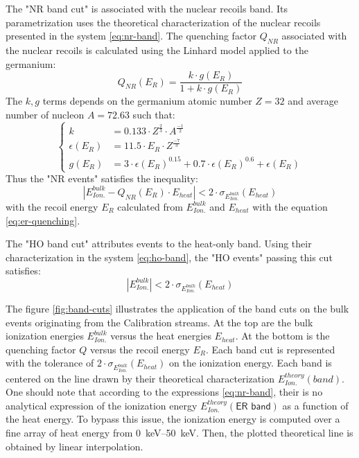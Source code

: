 The "NR band cut" is associated with the nuclear recoils band. Its parametrization uses the theoretical characterization of the nuclear recoils presented in the system \ref{eq:nr-band}. The quenching factor $Q_{NR}$ associated with the nuclear recoils  is calculated using the Linhard model applied to the germanium:
\begin{equation}
\label{eq:lindhard}
Q_{NR}(E_R) = \frac{k \cdot g(E_R)}{1+k \cdot g(E_R)}
\end{equation}
The $k,g$ terms depends on the germanium atomic number $Z=32$ and average number of nucleon $A=72.63$ such that:
\begin{equation}
\begin{cases}
k &= 0.133 \cdot Z^\frac{2}{3} \cdot A^\frac{-1}{2}
\\
\epsilon(E_R) &= 11.5 \cdot E_R \cdot Z^\frac{-7}{3}
\\
g(E_R) &= 3 \cdot \epsilon(E_R)^{0.15} + 0.7 \cdot\epsilon(E_R)^{0.6} + \epsilon(E_R) 
\end{cases}
\end{equation}
Thus the "NR events" satisfies the inequality:
\begin{equation}
\label{eq:condition-NR-ecei}
|E_{Ion.}^{bulk} - Q_{NR} \left( E_{R} \right) \cdot E_{heat}| < 2 \cdot \sigma_{E_{Ion.}^{bulk}} \left( E_{heat}\right)
\end{equation}
with the recoil energy $E_R$ calculated from $E_{Ion.}^{bulk}$ and $E_{heat}$ with the equation \ref{eq:er-quenching}.

The "HO band cut" attributes events to the heat-only band. Using their characterization in the system \ref{eq:ho-band}, the "HO events" passing this cut satisfies:
\begin{equation}
|E_{Ion.}^{bulk}| < 2 \cdot \sigma_{E_{Ion.}^{bulk}} \left( E_{heat}\right)
\end{equation}

The figure \ref{fig:band-cuts} illustrates the application of the band cuts on the bulk events originating from the Calibration streams. At the top are the bulk ionization energies $E_{Ion.}^{bulk}$ versus the heat energies $E_{heat}$. At the bottom is the quenching factor $Q$ versus the recoil energy $E_R$. Each band cut is represented with the tolerance of $2 \cdot \sigma_{E_{Ion.}^{bulk}} \left( E_{heat}\right)$ on the ionization  energy. Each band is centered on the line drawn by their theoretical characterization $E_{Ion.}^{theory}(band)$.
One should note that according to the expressions \ref{eq:nr-band}, their is no analytical expression of the ionization energy $E_{Ion.}^{theory}(\textsf{ER band})$ as a function of the heat energy. To bypass this issue, the ionization energy is computed over a fine array of heat energy from \SIrange{0}{50}{\kilo\eV}. Then, the plotted theoretical line is obtained by linear interpolation.

